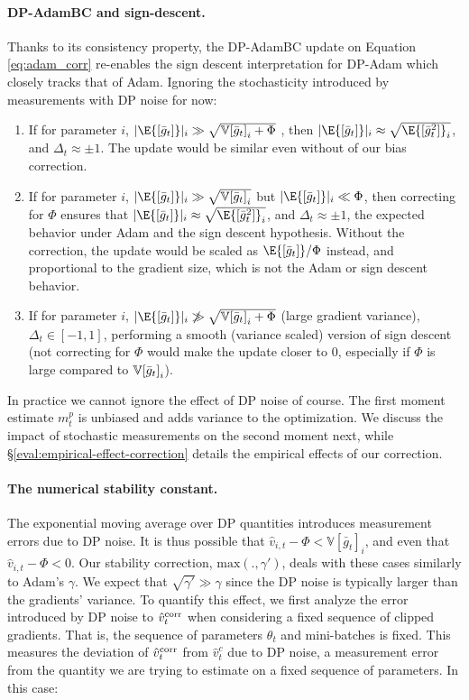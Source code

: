 \documentclass[letterpaper]{article} %
\def\V{\mathbb{V}}
\begin{document}
\paragraph{DP-AdamBC and sign-descent.} Thanks to its consistency property, the DP-AdamBC update on Equation \ref{eq:adam_corr} re-enables the sign descent interpretation for DP-Adam which closely tracks that of Adam. Ignoring the stochasticity introduced by measurements with DP noise for now:
\begin{enumerate}
    \item If for parameter $i$, $|\E{[\Bar{g}_t]}|_i \gg \sqrt{\V{[\Bar{g}_t]}_i + \Phi}$ , then $|\E{[\Bar{g}_t]}|_i \approx \sqrt{\E{[\Bar{g}^2_t]}_i}$, and $\Delta_t \approx \pm 1$. The update would be similar even without of our bias correction.
    \item If for parameter $i$, $|\E{[\Bar{g}_t]}|_i \gg \sqrt{\V{[\Bar{g}_t]}_i}$ but $|\E{[\Bar{g}_t]}|_i \ll \Phi$, then correcting for $\Phi$ ensures that $|\E{[\Bar{g}_t]}|_i \approx \sqrt{\E{[\Bar{g}^2_t]}_i}$, and $\Delta_t \approx \pm 1$, the expected behavior under Adam and the sign descent hypothesis. Without the correction, the update would be scaled as $\E{[\bar{g}_t]}/\Phi$ instead, and proportional to the gradient size, which is not the Adam or sign descent behavior.
    \item If for parameter $i$, $|\E{[\Bar{g}_t]}|_i \not\gg \sqrt{\V{[\Bar{g}_t]}_i + \Phi}$ (large gradient variance), $\Delta_t \in [-1, 1]$, performing a smooth (variance scaled) version of sign descent (not correcting for $\Phi$ would make the update closer to $0$, especially if $\Phi$ is large compared to $\V{[\Bar{g}_t]}_i$).
\end{enumerate}
In practice we cannot ignore the effect of DP noise of course. The first moment estimate $m_t^p$ is unbiased and adds variance to the optimization. We discuss the impact of stochastic measurements on the second moment next, while \S\ref{eval:empirical-effect-correction} details the empirical effects of our correction.

\paragraph{The numerical stability constant.}
The exponential moving average over DP quantities introduces measurement errors due to DP noise. It is thus possible that $\hat{v}_{i,t} - \Phi < \V{[\bar{g}_t]}_i$, and even that $\hat{v}_{i,t} - \Phi <0$. Our stability correction, $\textrm{max}( . , \gamma')$, deals with these cases similarly to Adam's $\gamma$. We expect that $\sqrt{\gamma'} \gg \gamma$ since the DP noise is typically larger than the gradients' variance.
%
To quantify this effect, we first analyze the error introduced by DP noise to $\hat{v}_t^{\textnormal{corr}}$ when considering a fixed sequence of clipped gradients. That is, the sequence of parameters $\theta_t$ and mini-batches is fixed. This measures the deviation of $\hat{v}_t^{\textnormal{corr}}$ from $\hat{v}_t^c$ due to DP noise, a measurement error from the quantity we are trying to estimate on a fixed sequence of parameters. In this case:
\end{document}
